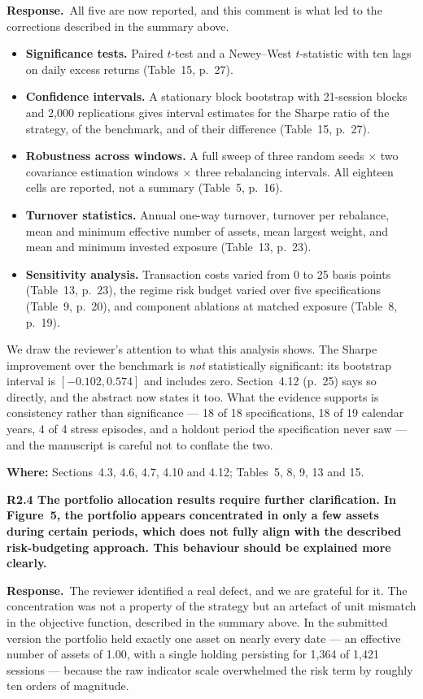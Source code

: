 \documentclass[11pt,a4paper]{article}
\newcommand{\rc}[1]{\par\medskip\noindent\textbf{#1}\par\nopagebreak}
\newcommand{\resp}{\par\noindent\textbf{Response.}\ }
\newcommand{\where}[1]{\par\smallskip\noindent\textcolor{blue!55!black}{\textbf{Where:} #1}\par}
\begin{document}
\resp All five are now reported, and this comment is what led to the corrections
described in the summary above.

\begin{itemize}
\item \textbf{Significance tests.} Paired $t$-test and a Newey--West $t$-statistic with
ten lags on daily excess returns (Table~15, p.~27).
\item \textbf{Confidence intervals.} A stationary block bootstrap with 21-session blocks
and 2{,}000 replications gives interval estimates for the Sharpe ratio of the strategy,
of the benchmark, and of their difference (Table~15, p.~27).
\item \textbf{Robustness across windows.} A full sweep of three random seeds $\times$ two
covariance estimation windows $\times$ three rebalancing intervals. All eighteen cells
are reported, not a summary (Table~5, p.~16).
\item \textbf{Turnover statistics.} Annual one-way turnover, turnover per rebalance,
mean and minimum effective number of assets, mean largest weight, and mean and minimum
invested exposure (Table~13, p.~23).
\item \textbf{Sensitivity analysis.} Transaction costs varied from 0 to 25 basis points
(Table~13, p.~23), the regime risk budget varied over five specifications (Table~9,
p.~20), and component ablations at matched exposure (Table~8, p.~19).
\end{itemize}

We draw the reviewer's attention to what this analysis shows. The Sharpe improvement
over the benchmark is \emph{not} statistically significant: its bootstrap interval is
$[-0.102, 0.574]$ and includes zero. Section~4.12 (p.~25) says so directly, and the
abstract now states it too. What the evidence supports is consistency rather than
significance --- 18 of 18 specifications, 18 of 19 calendar years, 4 of 4 stress
episodes, and a holdout period the specification never saw --- and the manuscript is
careful not to conflate the two.
\where{Sections~4.3, 4.6, 4.7, 4.10 and 4.12; Tables~5, 8, 9, 13 and 15.}

\rc{R2.4 The portfolio allocation results require further clarification. In Figure~5,
the portfolio appears concentrated in only a few assets during certain periods, which
does not fully align with the described risk-budgeting approach. This behaviour should
be explained more clearly.}

\resp The reviewer identified a real defect, and we are grateful for it. The
concentration was not a property of the strategy but an artefact of unit mismatch in the
objective function, described in the summary above. In the submitted version the
portfolio held exactly one asset on nearly every date --- an effective number of assets
of 1.00, with a single holding persisting for 1{,}364 of 1{,}421 sessions --- because the
raw indicator scale overwhelmed the risk term by roughly ten orders of magnitude.
\end{document}
